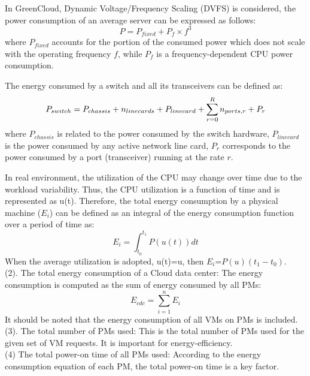 \documentclass[3p, twocolumn]{elsarticle}
\begin{document}
In GreenCloud, Dynamic Voltage/Frequency Scaling (DVFS) is considered, the power consumption of an average server can be expressed as follows:
\begin{equation}
P=P_{fixed}+P_f \times f^3
\end{equation}
where $P_{fixed}$ accounts for the portion of the consumed power which does not scale with the operating frequency $f$, while $P_f$ is a frequency-dependent CPU power consumption.

The energy consumed by a switch and all its transceivers can be defined as:
\begin{equation}
\footnotesize
P_{switch} = P_{chassis} + n_{linecards}+P_{linecard}+\sum_{r=0}^{R} n_{ports,r}+ P_r
\end{equation}
where $P_{chassis}$ is related to the power consumed by the switch hardware, $P_{linecard}$ is the power consumed by any active network line card, $P_r$ corresponds to the power consumed by a port (transceiver) running at the rate $r$.

In real environment, the utilization of the CPU may change over time due to the workload variability. Thus, the CPU utilization is a function of time and is represented as u(t). Therefore, the total energy consumption by a physical machine ($E_i$) can be defined as an integral of the energy consumption function over a period of time as:
\begin{equation}
E_i=\int_{t_0}^{t_1} P(u(t))dt
\end{equation}
When the average utilization is adopted, u(t)=u, then $E_i$=$P(u) (t_1-t_0)$.\\
(2). The total energy consumption of a Cloud data center: The energy consumption is computed as the sum of energy consumed by all PMs:
\begin{equation}
E_{cdc}=\sum_{i=1}^{n} E_i
\end{equation}
It should be noted that the energy consumption of all VMs on PMs is included. \\
(3). The total number of PMs used: This is the total number of PMs used for the given set of VM requests. It is important for energy-efficiency.\\
(4) The total power-on time of all PMs used: According to the energy consumption equation of each PM, the total power-on time is a key factor. \\
\end{document}
